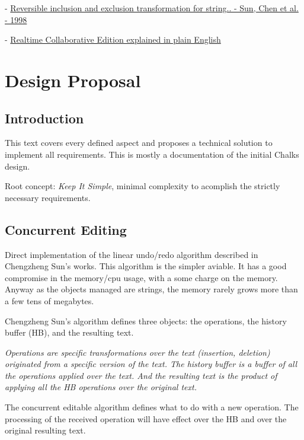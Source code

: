 \documentclass{report}
\begin{document}
- \href{http://citeseer.ist.psu.edu/sun98reversible.html}{Reversible inclusion and exclusion transformation for string.. - Sun, Chen et al. - 1998}

- \href{http://intcomm.wiki.taoriver.net/moin.cgi/RealTimeCooperativeEditingSystemsPaper}{Realtime Collaborative Edition explained in plain English}
\chapter{Design Proposal}

\section{Introduction}

This text covers every defined aspect and proposes a technical solution to implement all requirements.
This is mostly a documentation of the initial Chalks design.


Root concept: \emph{Keep It Simple}, minimal complexity to acomplish the strictly necessary requirements.


\section{Concurrent Editing}

Direct implementation of the linear undo/redo algorithm described in Chengzheng Sun's works. This algorithm is the simpler aviable. It has a good compromise in the memory/cpu usage, with a some charge on the memory. Anyway as the objects managed are strings, the memory rarely grows more than a few tens of megabytes.

Chengzheng Sun's algorithm defines three objects: the operations, the history buffer (HB), and the resulting text.

\em{Operations} are specific transformations over the text (insertion, deletion) originated from a specific version of the text. The \em{history buffer} is a buffer of all the operations applied over the text. And the resulting text is the product of applying all the HB operations over the original text.

The concurrent editable algorithm defines what to do with a new operation. The processing of the received operation will have effect over the HB and over the original resulting text.
\end{document}
